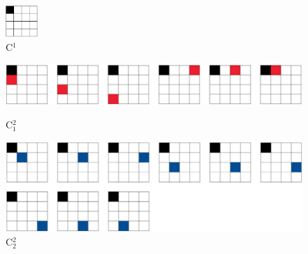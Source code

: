 \documentclass[11pt,dvipsnames]{article} %
\newcommand{\1}{\mathds{1}}
\begin{document}
\begin{figure}[H] %
	\centering
  \includegraphics[height=1.2cm]
	{img/C16.png}
	\caption{C${}^{1}$}
	\label{fig:2q-c1}
\end{figure} %

\begin{figure}[H] %
	\begin{minipage}[c]{0.5\textwidth}
		\centering
	  \includegraphics[width=.9\textwidth]
		{img/C12.png}
		\vspace{1.2cm}
		\caption{C${}_1^2$}
	\end{minipage}\hfill
	\begin{minipage}[c]{0.5\textwidth}
		\centering
	  \includegraphics[width=.9\textwidth]
		{img/C22.png}
		\caption{C${}_2^2$}
	\end{minipage}
\end{figure} %
\end{document}
